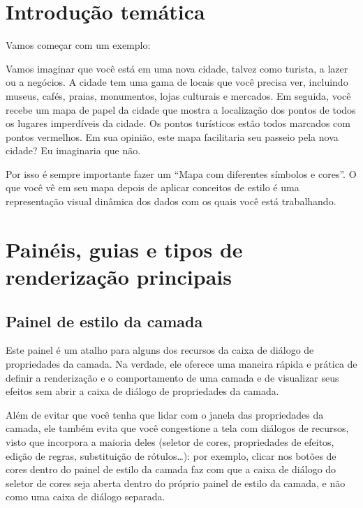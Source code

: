 \documentclass[
  portuguese,
]{krantz}
\begin{document}
\hypertarget{introduuxe7uxe3o-temuxe1tica-3}{%
\section{Introdução temática}\label{introduuxe7uxe3o-temuxe1tica-3}}

Vamos começar com um exemplo:

Vamos imaginar que você está em uma nova cidade, talvez como turista, a lazer ou a negócios. A cidade tem uma gama de locais que você precisa ver, incluindo museus, cafés, praias, monumentos, lojas culturais e mercados. Em seguida, você recebe um mapa de papel da cidade que mostra a localização dos pontos de todos os lugares imperdíveis da cidade. Os pontos turísticos estão todos marcados com pontos vermelhos. Em sua opinião, este mapa facilitaria seu passeio pela nova cidade? Eu imaginaria que não.

Por isso é sempre importante fazer um ``Mapa com diferentes símbolos e cores''. O que você vê em seu mapa depois de aplicar conceitos de estilo é uma representação visual dinâmica dos dados com os quais você está trabalhando.

\hypertarget{painuxe9is-guias-e-tipos-de-renderizauxe7uxe3o-principais}{%
\section{Painéis, guias e tipos de renderização principais}\label{painuxe9is-guias-e-tipos-de-renderizauxe7uxe3o-principais}}

\hypertarget{painel-de-estilo-da-camada}{%
\subsection{\texorpdfstring{\textbf{Painel de estilo da camada}}{Painel de estilo da camada}}\label{painel-de-estilo-da-camada}}

Este painel é um atalho para alguns dos recursos da caixa de diálogo de propriedades da camada. Na verdade, ele oferece uma maneira rápida e prática de definir a renderização e o comportamento de uma camada e de visualizar seus efeitos sem abrir a caixa de diálogo de propriedades da camada.

Além de evitar que você tenha que lidar com o janela das propriedades da camada, ele também evita que você congestione a tela com diálogos de recursos, visto que incorpora a maioria deles (seletor de cores, propriedades de efeitos, edição de regras, substituição de rótulos\ldots): por exemplo, clicar nos botões de cores dentro do painel de estilo da camada faz com que a caixa de diálogo do seletor de cores seja aberta dentro do próprio painel de estilo da camada, e não como uma caixa de diálogo separada.
\end{document}
